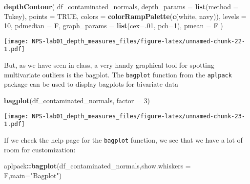\documentclass[
]{article}
\newenvironment{Shaded}{\begin{snugshade}}{\end{snugshade}}
\newcommand{\AttributeTok}[1]{\textcolor[rgb]{0.13,0.29,0.53}{#1}}
\newcommand{\ConstantTok}[1]{\textcolor[rgb]{0.56,0.35,0.01}{#1}}
\newcommand{\DecValTok}[1]{\textcolor[rgb]{0.00,0.00,0.81}{#1}}
\newcommand{\FunctionTok}[1]{\textcolor[rgb]{0.13,0.29,0.53}{\textbf{#1}}}
\newcommand{\NormalTok}[1]{#1}
\newcommand{\SpecialCharTok}[1]{\textcolor[rgb]{0.81,0.36,0.00}{\textbf{#1}}}
\newcommand{\StringTok}[1]{\textcolor[rgb]{0.31,0.60,0.02}{#1}}
\begin{document}
\begin{Shaded}
\begin{Highlighting}[]
\FunctionTok{depthContour}\NormalTok{(}
\NormalTok{  df\_contaminated\_normals,}
  \AttributeTok{depth\_params =} \FunctionTok{list}\NormalTok{(}\AttributeTok{method =} \StringTok{\textquotesingle{}Tukey\textquotesingle{}}\NormalTok{),}
  \AttributeTok{points =} \ConstantTok{TRUE}\NormalTok{,}
  \AttributeTok{colors =} \FunctionTok{colorRampPalette}\NormalTok{(}\FunctionTok{c}\NormalTok{(}\StringTok{\textquotesingle{}white\textquotesingle{}}\NormalTok{, }\StringTok{\textquotesingle{}navy\textquotesingle{}}\NormalTok{)),}
  \AttributeTok{levels =} \DecValTok{10}\NormalTok{,}
  \AttributeTok{pdmedian =}\NormalTok{ F,}
  \AttributeTok{graph\_params =} \FunctionTok{list}\NormalTok{(}\AttributeTok{cex=}\NormalTok{.}\DecValTok{01}\NormalTok{, }\AttributeTok{pch=}\DecValTok{1}\NormalTok{),}
  \AttributeTok{pmean =}\NormalTok{ F}
\NormalTok{)}
\end{Highlighting}
\end{Shaded}

\texttt{[image: NPS-lab01\_depth\_measures\_files/figure-latex/unnamed-chunk-22-1.pdf]}

But, as we have seen in class, a very handy graphical tool for spotting
multivariate outliers is the bagplot. The \texttt{bagplot} function from
the \texttt{aplpack} package can be used to display bagplots for
bivariate data

\begin{Shaded}
\begin{Highlighting}[]
\FunctionTok{bagplot}\NormalTok{(df\_contaminated\_normals, }\AttributeTok{factor =} \DecValTok{3}\NormalTok{)}
\end{Highlighting}
\end{Shaded}

\texttt{[image: NPS-lab01\_depth\_measures\_files/figure-latex/unnamed-chunk-23-1.pdf]}

If we check the help page for the \texttt{bagplot} function, we see that
we have a lot of room for customization:

\begin{Shaded}
\begin{Highlighting}[]
\NormalTok{aplpack}\SpecialCharTok{::}\FunctionTok{bagplot}\NormalTok{(df\_contaminated\_normals,}\AttributeTok{show.whiskers =}\NormalTok{ F,}\AttributeTok{main=}\StringTok{"Bagplot"}\NormalTok{)}
\end{Highlighting}
\end{Shaded}
\end{document}

